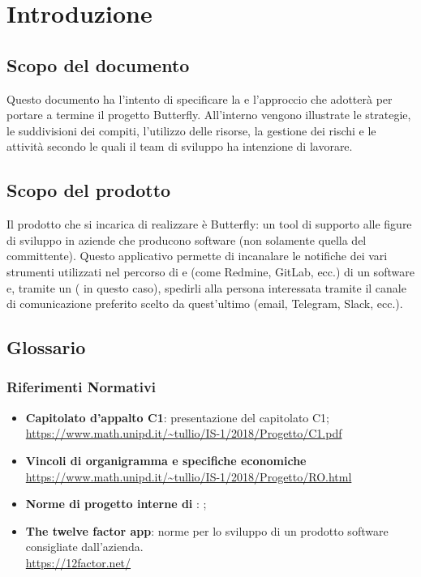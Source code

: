 \newpage
\section{Introduzione} \label{Introduzione}
	
	\subsection{Scopo del documento}
	Questo documento ha l'intento di specificare la  e l'approccio che \gruppo adotterà per portare a termine il progetto Butterfly.
	All'interno vengono illustrate le strategie, le suddivisioni dei compiti, l'utilizzo delle risorse, la gestione dei rischi e le attività secondo le quali il team di sviluppo ha intenzione di lavorare.
	
	\subsection{Scopo del prodotto}	
	Il prodotto che \gruppo si incarica di realizzare è Butterfly: un tool di supporto alle figure di sviluppo in aziende che producono software (non solamente quella del committente).
	Questo applicativo permette di incanalare le notifiche dei vari strumenti utilizzati nel percorso di  e  (come Redmine, GitLab, ecc.) di un software e, tramite un  ( in questo caso), spedirli alla persona interessata tramite il canale di comunicazione
	preferito scelto da quest'ultimo (email, Telegram, Slack, ecc.).
	
	\subsection{Glossario}
		\subsubsection{Riferimenti Normativi}
			\begin{itemize}
				\item \textbf{Capitolato d'appalto C1}: presentazione del capitolato C1;\\
				\url{https://www.math.unipd.it/~tullio/IS-1/2018/Progetto/C1.pdf}
				\item \textbf{Vincoli di organigramma e specifiche economiche}\\
				\url{https://www.math.unipd.it/~tullio/IS-1/2018/Progetto/RO.html}
				\item \textbf{Norme di progetto interne di \gruppo}: \NdPv;
				\item \textbf{The twelve factor app}: norme per lo sviluppo di un prodotto software consigliate dall'azienda.\\
				\url{https://12factor.net/}
			\end{itemize}
		
